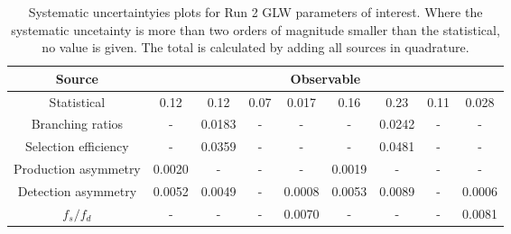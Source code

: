 \begin{table}
  \centering
  \begin{tabular}{ccccccccc}
      \toprule
      Source & \multicolumn{8}{c}{Observable} \\
      \midrule
      Statistical & 0.12 & 0.12 & 0.07 & 0.017 & 0.16 & 0.23 & 0.11 & 0.028 \\
      \midrule
      Branching ratios & \-- & 0.0183 & \-- & \-- & \-- & 0.0242 & \-- & \-- \\
      Selection efficiency & \-- & 0.0359 & \-- & \-- & \-- & 0.0481 & \-- & \-- \\
      Production asymmetry & 0.0020 & \-- & \-- & \-- & 0.0019 & \-- & \-- & \-- \\
      Detection asymmetry & 0.0052 & 0.0049 & \-- & 0.0008 & 0.0053 & 0.0089 & \-- & 0.0006 \\
      $f_s/f_d$ & \-- & \-- & \-- & 0.0070 & \-- & \-- & \-- & 0.0081 \\
      \bottomrule
  \end{tabular}
  \caption{Systematic uncertaintyies plots for Run 2 GLW parameters of interest. Where the systematic uncetainty is more than two orders of magnitude smaller than the statistical, no value is given. The total is calculated by adding all sources in quadrature.}
\label{tab:KK_run2_systematics}
\end{table}
